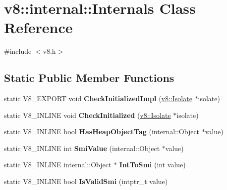 \hypertarget{classv8_1_1internal_1_1_internals}{}\section{v8\+:\+:internal\+:\+:Internals Class Reference}
\label{classv8_1_1internal_1_1_internals}


{\ttfamily \#include $<$v8.\+h$>$}

\subsection*{Static Public Member Functions}
\begin{DoxyCompactItemize}
\item 
\hypertarget{classv8_1_1internal_1_1_internals_ac5141eba7a786f0fa9f6db658f25d4ba}{}static V8\+\_\+\+E\+X\+P\+O\+R\+T void {\bfseries Check\+Initialized\+Impl} (\hyperlink{classv8_1_1_isolate}{v8\+::\+Isolate} $\ast$isolate)\label{classv8_1_1internal_1_1_internals_ac5141eba7a786f0fa9f6db658f25d4ba}

\item 
\hypertarget{classv8_1_1internal_1_1_internals_a1aa4bc86bc011f055fe27d18e0849b8c}{}static V8\+\_\+\+I\+N\+L\+I\+N\+E void {\bfseries Check\+Initialized} (\hyperlink{classv8_1_1_isolate}{v8\+::\+Isolate} $\ast$isolate)\label{classv8_1_1internal_1_1_internals_a1aa4bc86bc011f055fe27d18e0849b8c}

\item 
\hypertarget{classv8_1_1internal_1_1_internals_a0d611390ea5dde42847fe8237e4ced9d}{}static V8\+\_\+\+I\+N\+L\+I\+N\+E bool {\bfseries Has\+Heap\+Object\+Tag} (internal\+::\+Object $\ast$value)\label{classv8_1_1internal_1_1_internals_a0d611390ea5dde42847fe8237e4ced9d}

\item 
\hypertarget{classv8_1_1internal_1_1_internals_acdd6e8e3d151402cfa9eea84e3023a78}{}static V8\+\_\+\+I\+N\+L\+I\+N\+E int {\bfseries Smi\+Value} (internal\+::\+Object $\ast$value)\label{classv8_1_1internal_1_1_internals_acdd6e8e3d151402cfa9eea84e3023a78}

\item 
\hypertarget{classv8_1_1internal_1_1_internals_a9e5ab52581c9c32ac018fb1cc98ab5fa}{}static V8\+\_\+\+I\+N\+L\+I\+N\+E internal\+::\+Object $\ast$ {\bfseries Int\+To\+Smi} (int value)\label{classv8_1_1internal_1_1_internals_a9e5ab52581c9c32ac018fb1cc98ab5fa}

\item 
\hypertarget{classv8_1_1internal_1_1_internals_a69b0abda8cf242042f4f19bcba35fd18}{}static V8\+\_\+\+I\+N\+L\+I\+N\+E bool {\bfseries Is\+Valid\+Smi} (intptr\+\_\+t value)\label{classv8_1_1internal_1_1_internals_a69b0abda8cf242042f4f19bcba35fd18}


\end{DoxyCompactItemize}
